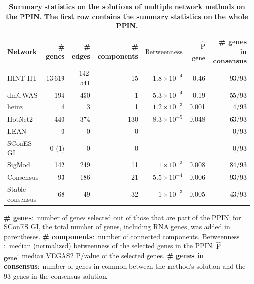 \documentclass[10pt,letterpaper]{article}
\newlength\savedwidth
\newcommand\thickhline{\noalign{\global\savedwidth\arrayrulewidth\global\arrayrulewidth 2pt}%
\hline
\noalign{\global\arrayrulewidth\savedwidth}}
\newcommand{\mean}[1]{$\overline{\mbox{#1}}$}
\newcommand{\median}[1]{$\hat{\mbox{#1}}$}
\begin{document}
\begin{table}[!ht]
  \begin{adjustwidth}{-2.25in}{0in} %
  \centering
  \caption{
  {\bf Summary statistics on the solutions of multiple network methods on the PPIN. The first row contains the summary statistics on the whole PPIN.}}
  \begin{tabular}{lrrrrrr}
  {\bf Network } & {\bf \# genes } & {\bf \# edges } & {\bf \# components } & {\bf \mean{Betweenness} } & {\bf \median{P}\textsubscript{gene} } & {\bf \# genes in consensus } \\
  \thickhline
  HINT HT           & 13\,619 & 142\,541  & 15  & $1.8 \times 10^{-4}$ & 0.46  & 93/93 \\
  \hline
  dmGWAS            & 194     & 450       & 1   & $5.3 \times 10^{-4}$ & 0.19  & 55/93 \\
  heinz             & 4       & 3         & 1   & $1.2 \times 10^{-3}$ & 0.001 & 4/93  \\
  HotNet2           & 440     & 374       & 130 & $8.3 \times 10^{-5}$ & 0.048 & 63/93 \\
  LEAN              & 0       & 0         & 0   & -         & -     & 0/93  \\
  SConES GI         & 0 (1)   & 0         & 0   & -         & -     & 0/93  \\
  SigMod            & 142     & 249       & 11  & $1 \times 10^{-3}$   & 0.008 & 84/93 \\
  \hline
  Consensus         & 93      & 186       & 21  & $5.5 \times 10^{-4}$ & 0.006 & 93/93 \\
  Stable consensus  & 68      & 49        & 32  & $1 \times 10^{-3}$   & 0.005 & 43/93 \\
  \end{tabular}
  \begin{flushleft} \textbf{\# genes}:~number of genes selected out of those that are part of the PPIN; for SConES GI, the total number of genes, including RNA genes, was added in parentheses. \textbf{\# components}:~number of connected components. \textbf{\mean{Betweenness}}:~median (normalized) betweenness of the selected genes in the PPIN. \textbf{\median{P}\textsubscript{gene}}:~median VEGAS2 P\=/value of the selected genes. \textbf{\# genes in consensus}:~number of genes in common between the method's solution and the 93 genes in the consensus solution.
  \end{flushleft}
  \label{tab:gene_solutions}
  \end{adjustwidth}
\end{table}
\end{document}
